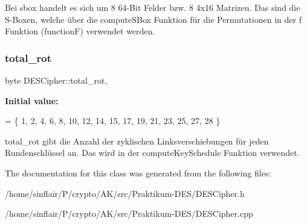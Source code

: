 Bei sbox handelt es sich um 8 64-\/\+Bit Felder bzw. 8 4x16 Matrizen. Das sind die S-\/\+Boxen, welche über die compute\+S\+Box Funktion für die Permutationen in der f Funktion (functionF) verwendet werden. \mbox{\label{classDESCipher_a28b1d159bad4462f7d89902cd65a8885}} 
\subsubsection{\texorpdfstring{total\+\_\+rot}{total\_rot}}
{\footnotesize\ttfamily byte D\+E\+S\+Cipher\+::total\+\_\+rot\hspace{0.3cm}{\ttfamily [static]}, {\ttfamily [private]}}

{\bfseries Initial value\+:}
\begin{DoxyCode}
= \{
        1, 2, 4, 6, 8, 10, 12, 14, 15, 17, 19, 21, 23, 25, 27, 28
\}
\end{DoxyCode}
total\+\_\+rot gibt die Anzahl der zyklischen Linksverschiebungen für jeden Rundenschlüssel an. Das wird in der compute\+Key\+Schedule Funktion verwendet. 

The documentation for this class was generated from the following files\+:\begin{DoxyCompactItemize}
\item 
/home/sinflair/\+P/crypto/\+A\+K/src/\+Praktikum-\/\+D\+E\+S/D\+E\+S\+Cipher.\+h\item 
/home/sinflair/\+P/crypto/\+A\+K/src/\+Praktikum-\/\+D\+E\+S/D\+E\+S\+Cipher.\+cpp\end{DoxyCompactItemize}

